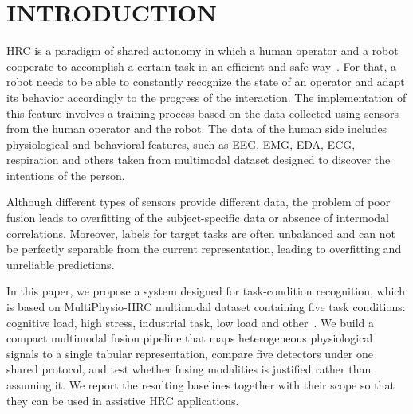 \documentclass[a4paper,twoside]{article}
\begin{document}
\onecolumn \maketitle \normalsize \setcounter{footnote}{0} \acresetall

\section{\uppercase{Introduction}}\label{sec:introduction}

\noindent \ac{HRC} is a paradigm of shared autonomy in which a human operator and a robot cooperate to accomplish a certain task in an efficient and safe way~\cite{selvaggio2021autonomy,borghi2025operatorstress}. For that, a robot needs to be able to constantly recognize the state of an operator and adapt its behavior accordingly to the progress of the interaction. The implementation of this feature involves a training process based on the data collected using sensors from the human operator and the robot. The data of the human side includes physiological and behavioral features, such as \ac{EEG}, \ac{EMG}, \ac{EDA}, \ac{ECG}, respiration and others taken from multimodal dataset designed to discover the intentions of the person.

Although different types of sensors provide different data, the problem of poor fusion leads to overfitting of the subject-specific data or absence of intermodal correlations. Moreover, labels for target tasks are often unbalanced and can not be perfectly separable from the current representation, leading to overfitting and unreliable predictions.

In this paper, we propose a system designed for task-condition recognition, which is based on MultiPhysio-HRC multimodal dataset containing five task conditions: cognitive load, high stress, industrial task, low load and other~\cite{bussolan2025multiphysiohrc}. We build a compact multimodal fusion pipeline that maps heterogeneous physiological signals to a single tabular representation, compare five detectors under one shared protocol, and test whether fusing modalities is justified rather than assuming it. We report the resulting baselines together with their scope so that they can be used in assistive \ac{HRC} applications.
\end{document}
